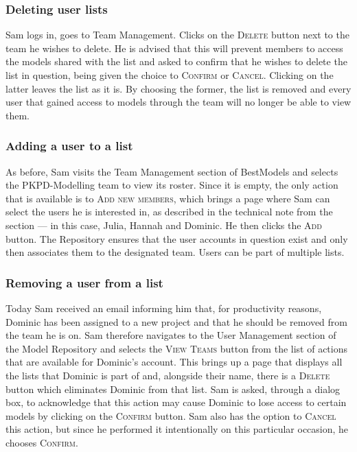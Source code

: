 \subsubsection{Deleting user lists}

Sam logs in, goes to Team Management. Clicks on the \textsc{Delete} button next to the team he wishes to delete. He is advised that this will prevent members to access the models shared with the list and asked to confirm that he wishes to delete the list in question, being given the choice to \textsc{Confirm} or \textsc{Cancel}. Clicking on the latter leaves the list as it is. By choosing the former, the list is removed and every user that gained access to models through the team will no longer be able to view them.

\subsubsection{Adding a user to a list}
As before, Sam visits the Team Management section of BestModels and selects the PKPD-Modelling team to view its roster. Since it is empty, the only action that is available is to \textsc{Add new members}, which brings a page where Sam can select the users he is interested in, as described in the technical note from the  section --- in this case, Julia, Hannah and Dominic. He then clicks the \textsc{Add} button. The Repository ensures that the user accounts in question exist and only then associates them to the designated team. Users can be part of multiple lists.


\subsubsection{Removing a user from a list}

Today Sam received an email informing him that, for productivity reasons, Dominic has been assigned to a new project and that he should be removed from the team he is on. Sam therefore navigates to the User Management section of the Model Repository and selects the \textsc{View Teams} button from the list of actions that are available for Dominic's account. This brings up a page that displays all the lists that Dominic is part of and, alongside their name, there is a \textsc{Delete} button which eliminates Dominic from that list. Sam is asked, through a dialog box, to acknowledge that this action may cause Dominic to lose access to certain models by clicking on the \textsc{Confirm} button. Sam also has the option to \textsc{Cancel} this action, but since he performed it intentionally on this particular occasion, he chooses \textsc{Confirm}.

